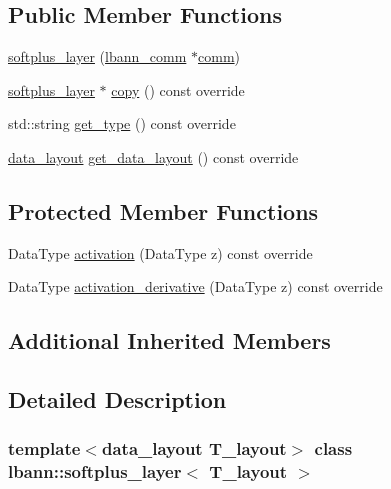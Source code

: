 \subsection*{Public Member Functions}
\begin{DoxyCompactItemize}
\item 
\hyperlink{classlbann_1_1softplus__layer_a5c80b19945ae94541bf5edb53b664c69}{softplus\+\_\+layer} (\hyperlink{classlbann_1_1lbann__comm}{lbann\+\_\+comm} $\ast$\hyperlink{file__io_8cpp_ab048c6f9fcbcfaa57ce68b00263dbebe}{comm})
\item 
\hyperlink{classlbann_1_1softplus__layer}{softplus\+\_\+layer} $\ast$ \hyperlink{classlbann_1_1softplus__layer_aef624d9020d403f6a19da8742ec9c1d2}{copy} () const override
\item 
std\+::string \hyperlink{classlbann_1_1softplus__layer_ae95163214d6129880586b11d2de407a1}{get\+\_\+type} () const override
\item 
\hyperlink{base_8hpp_a786677cbfb3f5677b4d84f3056eb08db}{data\+\_\+layout} \hyperlink{classlbann_1_1softplus__layer_a1bc0899e41772148e581b7b8c53763e3}{get\+\_\+data\+\_\+layout} () const override
\end{DoxyCompactItemize}
\subsection*{Protected Member Functions}
\begin{DoxyCompactItemize}
\item 
Data\+Type \hyperlink{classlbann_1_1softplus__layer_aff73da03e891b4ea54d5ffc0618425b4}{activation} (Data\+Type z) const override
\item 
Data\+Type \hyperlink{classlbann_1_1softplus__layer_a164deff1fd79a8eea743580eba4f6a60}{activation\+\_\+derivative} (Data\+Type z) const override
\end{DoxyCompactItemize}
\subsection*{Additional Inherited Members}


\subsection{Detailed Description}
\subsubsection*{template$<$data\+\_\+layout T\+\_\+layout$>$\newline
class lbann\+::softplus\+\_\+layer$<$ T\+\_\+layout $>$}

